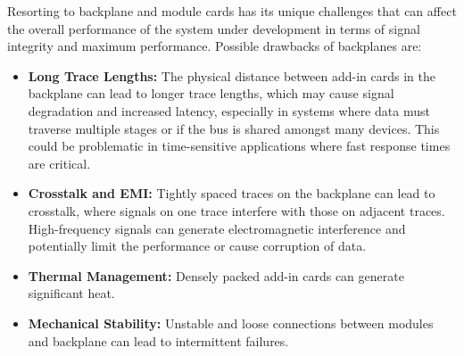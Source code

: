 Resorting to backplane and module cards has its unique challenges that
can affect the overall performance of the system under development
in terms of signal integrity and maximum performance. Possible drawbacks
of backplanes are:

\begin{itemize}[topsep=8pt,itemsep=4pt,partopsep=4pt, parsep=4pt]
    \item \textbf{Long Trace Lengths:}
    The physical distance between add-in cards in the backplane can lead to
    longer trace lengths, which may cause signal degradation and increased
    latency, especially in systems where data must traverse multiple stages or
    if the bus is shared amongst many devices.
    This could be problematic in time-sensitive applications where fast
    response times are critical.

    \item \textbf{Crosstalk and \acs{EMI}:}
    Tightly spaced traces on the backplane can lead to crosstalk, where signals
    on one trace interfere with those on adjacent traces.
    High-frequency signals can generate electromagnetic interference and
    potentially limit the performance or cause corruption of data.

    \item \textbf{Thermal Management:}
    Densely packed add-in cards can generate significant heat.

    \item \textbf{Mechanical Stability:}
    Unstable and loose connections between modules and backplane can lead to
    intermittent failures.

\end{itemize}

